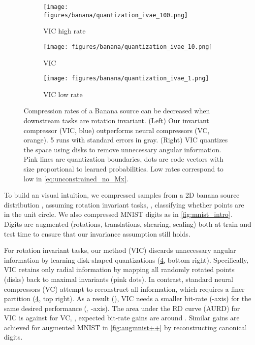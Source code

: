 \documentclass[final]{article}
\begin{document}
\begin{figure}
\begin{minipage}{.48\linewidth}
     
     \begin{subfigure}{0.32\columnwidth}
         \centering
         \texttt{[image: figures/banana/quantization\_ivae\_100.png]}
         \vspace{-1.3em}
         \caption{VIC high rate}
         \label{fig:bananas_sweepivae_100}
     \end{subfigure}
     \begin{subfigure}{0.32\columnwidth}
         \centering
         \texttt{[image: figures/banana/quantization\_ivae\_10.png]}
         \vspace{-1.3em}
         \caption{VIC }
         \label{fig:bananas_sweepivae_10}
     \end{subfigure}
     \begin{subfigure}{0.32\columnwidth}
         \centering
         \texttt{[image: figures/banana/quantization\_ivae\_1.png]}
         \vspace{-1.3em}
         \caption{VIC low rate }
         \label{fig:bananas_sweepivae_1}
     \end{subfigure}
     \end{minipage}
\caption{
Compression rates of a Banana source \cite{balle_nonlinear_2020} can be decreased when downstream tasks are rotation invariant. 
(Left) Our invariant compressor (VIC, blue) outperforms neural compressors (VC, orange). 5 runs with standard errors in gray.
(Right) VIC quantizes the space using disks to remove unnecessary angular information.
Pink lines are quantization boundaries, dots are code vectors with size proportional to learned probabilities.
Low rates correspond to low  in \cref{eq:unconstrained_no_Mx}.
}
\label{fig:bananas_sweeps}
\vspace{-1\baselineskip}
\end{figure}
To build an visual intuition, we compressed samples from a 2D banana source distribution \cite{balle_nonlinear_2020}, assuming rotation invariant tasks, \eg, classifying whether points are in the unit circle.
We also compressed MNIST digits as in \cref{fig:mnist_intro}.
Digits are augmented (rotations, translations, shearing, scaling) both at train and test time to ensure that our invariance assumption still holds.

For rotation invariant tasks, our method (VIC) discards unnecessary angular information by learning disk-shaped quantizations (\cref{fig:bananas_sweeps}, bottom right).
Specifically, VIC retains only radial information 
by mapping all randomly rotated points (disks) back to maximal invariants (pink dots).
In contrast, standard neural compressors (VC) attempt to reconstruct all information, which requires a finer partition (\cref{fig:bananas_sweeps}, top right).
As a result (), VIC needs a smaller bit-rate (-axis) for the same desired performance (\disttextinv{}, -axis).
The area under the RD curve (AURD) for VIC is  against  for VC, \ie, expected bit-rate gains are around .
Similar gains are achieved for augmented MNIST in  \cref{fig:augmnist++} by reconstructing canonical digits.
\end{document}
